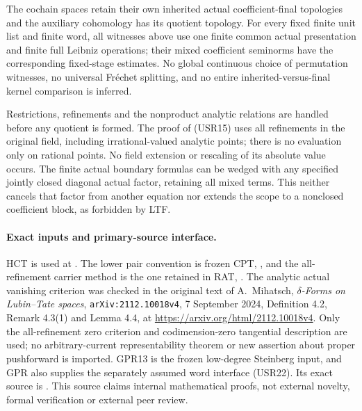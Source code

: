 The cochain spaces retain their own inherited actual coefficient-final
topologies and the auxiliary cohomology has its quotient topology.
For every fixed finite unit list and finite word, all witnesses above
use one finite common actual presentation and finite full Leibniz
operations; their mixed coefficient seminorms have the corresponding
fixed-stage estimates.  No global continuous choice of permutation
witnesses, no universal Fr\'echet splitting, and no entire
inherited-versus-final kernel comparison is inferred.

Restrictions, refinements and the nonproduct analytic relations are
handled before any quotient is formed.  The proof of (USR15) uses
all refinements in the original field, including irrational-valued
analytic points; there is no evaluation only on rational points.
No field extension or rescaling of its absolute value occurs.
The finite actual boundary formulas can be wedged with any specified
jointly closed diagonal actual factor, retaining all mixed terms.
This neither cancels that factor from another equation nor extends
the scope to a nonclosed coefficient block, as forbidden by LTF.

\paragraph{Exact inputs and primary-source interface.}
HCT is used at
.
The lower pair convention is frozen CPT,
,
and the all-refinement carrier method is the one retained in RAT,
.
The analytic actual vanishing criterion was checked in the original
text of A.~Mihatsch, \emph{$\delta$-Forms on Lubin--Tate spaces},
\texttt{arXiv:2112.10018v4}, 7 September 2024, Definition 4.2,
Remark 4.3(1) and Lemma 4.4, at
\url{https://arxiv.org/html/2112.10018v4}.
Only the all-refinement zero criterion and codimension-zero tangential
description are used; no arbitrary-current representability theorem
or new assertion about proper pushforward is imported.
GPR13 is the frozen low-degree Steinberg input, and GPR also supplies
the separately assumed word interface (USR22).  Its exact source is
.
This source claims internal mathematical proofs, not external novelty,
formal verification or external peer review.
